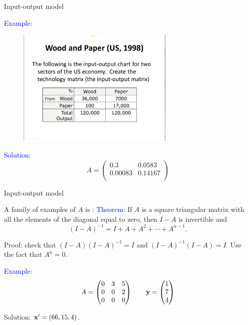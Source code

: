 \documentclass[11pt,aspectratio=169]{beamer}
\begin{document}
\begin{frame}{Input-output model}

\textcolor{blue}{Example:}  

\begin{figure}
\includegraphics[width=3in]{img/io} 
\end{figure}

\textcolor{blue}{Solution:}  \begin{equation*} 
 A=\begin{pmatrix}
0.3 & 0.0583\\
0.00083 & 0.14167\\
\end{pmatrix}
\end{equation*}\end{frame}
\begin{frame}{Input-output model}

 A family of examples of $A$ is :
 \vskip 10pt
\textcolor{blue}{Theorem:} If $A$ is a square triangular matrix with all the elements of the diagonal equal to zero, then $I-A$ is invertible and
$$
(I-A)^{-1}=I+A+A^2+\cdots+A^{n-1}.
$$

\begin{tiny}Proof: check that $(I-A)(I-A)^{-1}=I$ and $(I-A)^{-1}(I-A)=I$. Use  the fact that $A^n=0$.\end{tiny}
\vskip 12pt
 \textcolor{blue}{Example:}  \begin{equation*} 
 A=\begin{pmatrix}
0 & 3 & 5\\
0 & 0 & 2 \\
0 & 0 & 0
\end{pmatrix}\qquad
\bf{y}= \begin{pmatrix}
1\\
7 \\
4
\end{pmatrix}
\end{equation*}

Solution: ${\bf x}'=(66,15, 4)$.\end{frame}
\end{document}
